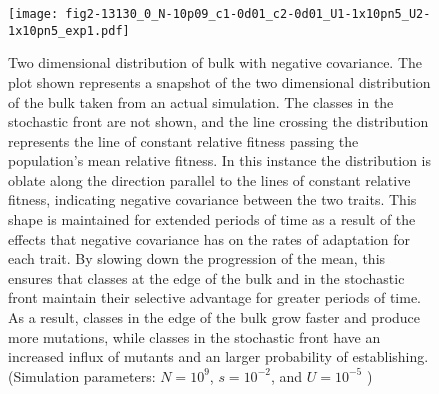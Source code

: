\documentclass[11pt,twocolumn]{article}
\begin{document}
\begin{figure}
\texttt{[image: fig2-13130\_0\_N-10p09\_c1-0d01\_c2-0d01\_U1-1x10pn5\_U2-1x10pn5\_exp1.pdf]}
\label{Figure}
\caption{\footnotesize Two dimensional distribution of bulk with negative covariance. The plot shown represents a snapshot of the two dimensional distribution of the bulk taken from an actual simulation. The classes in the stochastic front are not shown, and the line crossing the distribution represents the line of constant relative fitness passing the population's mean relative fitness. In this instance the distribution is oblate along the direction parallel to the lines of constant relative fitness, indicating negative covariance between the two traits.  This shape is maintained for extended periods of time as a result of the effects that negative covariance has on the rates of adaptation for each trait.  By slowing down the progression of the mean, this ensures that classes at the edge of the bulk and in the stochastic front maintain their selective advantage for greater periods of time.  As a result, classes in the edge of the bulk grow faster and produce more mutations, while classes in the stochastic front have an increased influx of mutants and an larger probability of establishing. (Simulation parameters: $N=10^9$, $s=10^{-2}$, and $U=10^{-5}$ )}
\end{figure}
\end{document}
